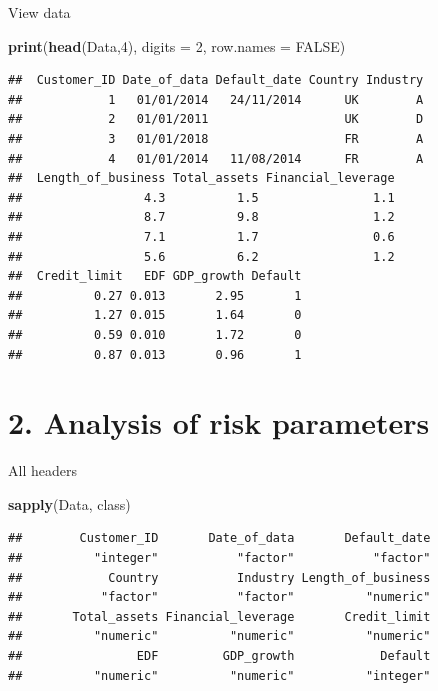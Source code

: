 \documentclass[9pt,ignorenonframetext,]{beamer}
\newenvironment{Shaded}{\begin{snugshade}}{\end{snugshade}}
\newcommand{\KeywordTok}[1]{\textcolor[rgb]{0.13,0.29,0.53}{\textbf{#1}}}
\newcommand{\DataTypeTok}[1]{\textcolor[rgb]{0.13,0.29,0.53}{#1}}
\newcommand{\DecValTok}[1]{\textcolor[rgb]{0.00,0.00,0.81}{#1}}
\newcommand{\OtherTok}[1]{\textcolor[rgb]{0.56,0.35,0.01}{#1}}
\newcommand{\NormalTok}[1]{#1}
\begin{document}
\begin{frame}[fragile]{View data}

\begin{Shaded}
\begin{Highlighting}[]
\KeywordTok{print}\NormalTok{(}\KeywordTok{head}\NormalTok{(Data,}\DecValTok{4}\NormalTok{), }\DataTypeTok{digits =} \DecValTok{2}\NormalTok{, }\DataTypeTok{row.names =} \OtherTok{FALSE}\NormalTok{)}
\end{Highlighting}
\end{Shaded}

\begin{verbatim}
##  Customer_ID Date_of_data Default_date Country Industry
##            1   01/01/2014   24/11/2014      UK        A
##            2   01/01/2011                   UK        D
##            3   01/01/2018                   FR        A
##            4   01/01/2014   11/08/2014      FR        A
##  Length_of_business Total_assets Financial_leverage
##                 4.3          1.5                1.1
##                 8.7          9.8                1.2
##                 7.1          1.7                0.6
##                 5.6          6.2                1.2
##  Credit_limit   EDF GDP_growth Default
##          0.27 0.013       2.95       1
##          1.27 0.015       1.64       0
##          0.59 0.010       1.72       0
##          0.87 0.013       0.96       1
\end{verbatim}

\end{frame}

\section{2. Analysis of risk
parameters}\label{analysis-of-risk-parameters}

\begin{frame}[fragile]{All headers}

\begin{Shaded}
\begin{Highlighting}[]
\KeywordTok{sapply}\NormalTok{(Data, class)}
\end{Highlighting}
\end{Shaded}

\begin{verbatim}
##        Customer_ID       Date_of_data       Default_date 
##          "integer"           "factor"           "factor" 
##            Country           Industry Length_of_business 
##           "factor"           "factor"          "numeric" 
##       Total_assets Financial_leverage       Credit_limit 
##          "numeric"          "numeric"          "numeric" 
##                EDF         GDP_growth            Default 
##          "numeric"          "numeric"          "integer"
\end{verbatim}

\end{frame}
\end{document}
